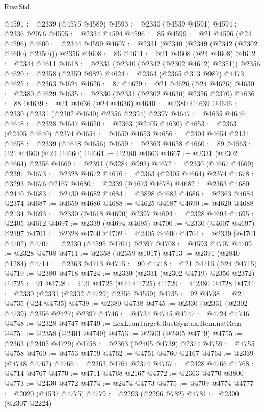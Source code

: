 \begin{lexlean}{RustStd}
\begin{coremodule}
@4591 := @2339 (@4575 @4589)
@4593 := @2330 (@4539 @4591)
@4594 := @2336 @2076
@4595 := @2334 @4594
@4596 := 85
@4599 := @21 @4596 (@24 @4596)
@4600 := @2344 @4599
@4607 := @2331 (@2340 (@2349 (@2342 (@2302 @4600) @2350))) @2356
@4608 := 86
@4611 := @21 @4608 (@24 @4608)
@4612 := @2344 @4611
@4618 := @2331 (@2340 (@2342 (@2302 @4612) @2351)) @2356
@4620 := @2358 (@2359 @982)
@4624 := @2364 (@2365 @313 @987) @4473
@4625 := @2363 @4624
@4626 := 87
@4629 := @21 @4626 (@24 @4626)
@4630 := @2380 @4629
@4635 := @2330 (@2331 (@2302 @4630) @2356 @2370)
@4636 := 88
@4639 := @21 @4636 (@24 @4636)
@4640 := @2380 @4639
@4646 := @2330 (@2331 (@2302 @4640) @2356 @2394) @2397
@4647 := @4635 @4646
@4648 := @2328 @4647
@4650 := @2363 (@2405 @4630)
@4653 := @2363 (@2405 @4640) @2374
@4654 := @4650 @4653
@4656 := @2404 @4654 @2134
@4658 := @2339 (@4648 @4656)
@4659 := @2363 @4658
@4660 := 89
@4663 := @21 @4660 (@24 @4660)
@4664 := @2380 @4663
@4667 := @2331 (@2302 @4664) @2356
@4669 := @2391 (@3284 @993)
@4672 := @2330 (@4667 @4669) @2397
@4673 := @2328 @4672
@4676 := @2363 (@2405 @4664) @2374
@4678 := @3293 @4676 @2167
@4680 := @2339 (@4673 @4678)
@4682 := @2363 @4680 @2440
@4683 := @2430 @4682
@4684 := @3898 @4683
@4686 := @2363 @4684 @2374
@4687 := @4659 @4686
@4688 := @4625 @4687
@4690 := @4620 @4688 @2134
@4693 := @2330 (@4618 @4690) @2397
@4694 := @2328 @4693
@4695 := @2405 @4612
@4697 := @2339 (@4694 @4695)
@4700 := @2330 (@4607 @4697) @2397
@4701 := @2328 @4700
@4702 := @2405 @4600
@4704 := @2339 (@4701 @4702)
@4707 := @2330 (@4595 @4704) @2397
@4708 := @4593 @4707
@4709 := @2328 @4708
@4711 := @2358 (@2359 @1017)
@4713 := @2391 (@2840 @1284)
@4714 := @2363 @4713
@4715 := 90
@4718 := @21 @4715 (@24 @4715)
@4719 := @2380 @4718
@4724 := @2330 (@2331 (@2302 @4719) @2356 @2372)
@4725 := 91
@4728 := @21 @4725 (@24 @4725)
@4729 := @2380 @4728
@4734 := @2330 (@2331 (@2302 @4729) @2356 @4559)
@4735 := 92
@4738 := @21 @4735 (@24 @4735)
@4739 := @2380 @4738
@4745 := @2330 (@2331 (@2302 @4739) @2356 @2427) @2397
@4746 := @4734 @4745
@4747 := @4724 @4746
@4748 := @2328 @4747
@4749 := LexLeanTarget.RustSyntax.Item.natRem
@4751 := @2358 (@2401 @4749)
@4753 := @2363 (@2405 @4719)
@4755 := @2363 (@2405 @4729)
@4758 := @2363 (@2405 @4739) @2374
@4759 := @4755 @4758
@4760 := @4753 @4759
@4762 := @4751 @4760 @2167
@4764 := @2339 (@4748 @4762)
@4766 := @2363 @4764 @2374
@4767 := @2428 @4766
@4768 := @4714 @4767
@4770 := @4711 @4768 @2167
@4772 := @2363 @4770 @3800
@4773 := @2430 @4772
@4774 := @2474 @4773
@4775 := @4709 @4774
@4777 := @2020 (@4537 @4775)
@4779 := @2293 (@2296 @782)
@4781 := @2300 (@2307 @2224)

\end{coremodule}
\end{lexlean}
